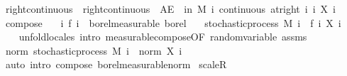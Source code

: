 \begin{isabellebody}
\isamarkupfalse%
\ right{\isacharunderscore}{\kern0pt}continuous\ \ {\isachardoublequoteopen}right{\isacharunderscore}{\kern0pt}continuous\ {\isacharequal}{\kern0pt}\ {\isacharparenleft}{\kern0pt}AE\ {\isasymxi}\ in\ M{\isachardot}{\kern0pt}\ {\isasymforall}i{\isachardot}{\kern0pt}\ continuous\ {\isacharparenleft}{\kern0pt}at{\isacharunderscore}{\kern0pt}right\ i{\isacharparenright}{\kern0pt}\ {\isacharparenleft}{\kern0pt}{\isasymlambda}i{\isachardot}{\kern0pt}\ X\ i\ {\isasymxi}{\isacharparenright}{\kern0pt}{\isacharparenright}{\kern0pt}{\isachardoublequoteclose}\isanewline
\isanewline
{}\isamarkupfalse%
\ compose{\isacharcolon}{\kern0pt}\isanewline
\ \ \ {\isachardoublequoteopen}{\isasymAnd}i{\isachardot}{\kern0pt}\ f\ i\ {\isasymin}\ borel{\isacharunderscore}{\kern0pt}measurable\ borel{\isachardoublequoteclose}\isanewline
\ \ \ {\isachardoublequoteopen}stochastic{\isacharunderscore}{\kern0pt}process\ M\ {\isacharparenleft}{\kern0pt}{\isasymlambda}i\ {\isasymxi}{\isachardot}{\kern0pt}\ {\isacharparenleft}{\kern0pt}f\ i{\isacharparenright}{\kern0pt}\ {\isacharparenleft}{\kern0pt}X\ i\ {\isasymxi}{\isacharparenright}{\kern0pt}{\isacharparenright}{\kern0pt}{\isachardoublequoteclose}\isanewline
%
\isadelimproof
\ \ %
\endisadelimproof
%
\isatagproof
{}\isamarkupfalse%
\ {\isacharparenleft}{\kern0pt}unfold{\isacharunderscore}{\kern0pt}locales{\isacharcomma}{\kern0pt}\ intro\ measurable{\isacharunderscore}{\kern0pt}compose{\isacharbrackleft}{\kern0pt}OF\ random{\isacharunderscore}{\kern0pt}variable\ assms{\isacharbrackright}{\kern0pt}{\isacharparenright}{\kern0pt}%
\endisatagproof
{\isafoldproof}%
%
\isadelimproof
\ \isanewline
%
\endisadelimproof
\isanewline
{}\isamarkupfalse%
\ norm{\isacharcolon}{\kern0pt}\ {\isachardoublequoteopen}stochastic{\isacharunderscore}{\kern0pt}process\ M\ {\isacharparenleft}{\kern0pt}{\isasymlambda}i\ {\isasymxi}{\isachardot}{\kern0pt}\ norm\ {\isacharparenleft}{\kern0pt}X\ i\ {\isasymxi}{\isacharparenright}{\kern0pt}{\isacharparenright}{\kern0pt}{\isachardoublequoteclose}%
\isadelimproof
\ %
\endisadelimproof
%
\isatagproof
{}\isamarkupfalse%
\ {\isacharparenleft}{\kern0pt}auto\ intro{\isacharcolon}{\kern0pt}\ compose\ borel{\isacharunderscore}{\kern0pt}measurable{\isacharunderscore}{\kern0pt}norm{\isacharparenright}{\kern0pt}%
\endisatagproof
{\isafoldproof}%
%
\isadelimproof
%
\endisadelimproof
\isanewline
\isanewline
{}\isamarkupfalse%
\ scaleR{\isacharcolon}{\kern0pt}\isanewline

\end{isabellebody}
